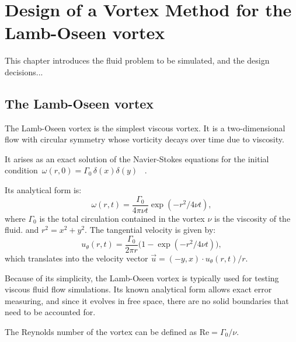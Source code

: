 \chapter{Design of a Vortex Method for the Lamb-Oseen vortex}
\label{ch:vm-design}


This chapter introduces the fluid problem to be simulated,
and the design decisions...

\section{The Lamb-Oseen vortex}
\label{sec:lamb-oseen-vortex}

The Lamb-Oseen vortex is the simplest viscous vortex.
It is a two-dimensional flow with circular symmetry
whose vorticity decays over time due to viscosity.

It arises as an exact solution of the Navier-Stokes equations
for the initial condition~\(ω(r, 0) = Γ_0\,δ(x) δ(y)\)%
~\cite[\S13.1]{saffman95}.

Its analytical form is:
\begin{equation}
  \label{eq:lamb-oseen-vorticity}
  ω(r, t) = \frac{Γ_0}{4πνt} \exp(-r^2/4νt),
\end{equation}
where \(Γ_0\) is the total circulation contained in the vortex
\(ν\) is the viscosity of the fluid.
and \(r^2 = x^2 + y^2\).
The tangential velocity is given by:
\begin{equation}
  \label{eq:lamb-oseen-tangential-velocity}
  u_\theta(r, t) = \frac{Γ_0}{2πr} \bigl(1 - \exp(-r^2/4νt)\bigr),
\end{equation}
which translates into the velocity vector
\(\vec{u} = (-y, x)\cdot u_\theta(r, t)/r \).


Because of its simplicity,
the Lamb-Oseen vortex is typically used
for testing viscous fluid flow simulations.
Its known analytical form allows exact error measuring,
and since it evolves in free space,
there are no solid boundaries that need to be accounted for.

The Reynolds number of the vortex
can be defined as \(\text{Re} = Γ_0/ν\).


